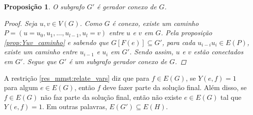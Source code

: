 \documentclass[11pt,reqno]{amsart}
\newtheorem{proposicao}{Proposição}
\begin{document}
\begin{proposicao}
\label{prop:gerador_conexo_G}
O subgrafo $G'$ é gerador conexo de $G$.
\begin{proof}
Seja $u,v \in V(G)$. Como $G$ é conexo, existe um caminho 
$P = (u = u_0, u_1, ..., u_{l-1}, u_l = v)$ entre $u$ e $v$ em $G$. 
Pela proposição \ref{prop:Yuv_caminho} e sabendo que $G[F(e)] \subseteq G'$, 
para cada $u_{i-i}u_{i} \in E(P)$, existe um caminho entre $u_{i-1}$ e 
$u_{i}$ em $G'$. 
Sendo assim, $u$ e $v$ estão conectados em $G'$. Segue que $G'$ é um 
subgrafo gerador conexo de $G$.
\end{proof}
\end{proposicao}

A restrição \ref{res_mmst:relate_vars} 
diz que para $f \in E(G)$, se $Y(e,f) = 1$ para algum $e \in E(G)$, então $f$ 
deve fazer parte da solução final. Além disso, se $f \in E(G)$ 
não faz parte da solução final, então não existe $e \in E(G)$ tal que $Y(e,f) = 1$. 
Em outras palavras, $E(G') \subseteq E(H)$.

\end{document}
